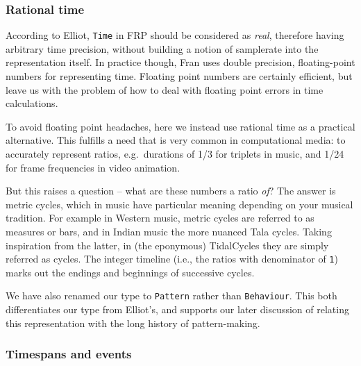\subsubsection{Rational time}\label{rational-time}

According to Elliot, \texttt{Time} in FRP should be considered as
\emph{real}, therefore having arbitrary time precision, without building
a notion of samplerate into the representation itself. In practice
though, Fran uses double precision, floating-point numbers for
representing time. Floating point numbers are certainly efficient, but
leave us with the problem of how to deal with floating point errors in
time calculations.

To avoid floating point headaches, here we instead use rational time as
a practical alternative. This fulfills a need that is very common in
computational media: to accurately represent ratios, e.g.~durations of
1/3 for triplets in music, and 1/24 for frame frequencies in video
animation.

\begin{Shaded}
\begin{Highlighting}[]
  \OtherTok{=} 
 \OtherTok{=}  \OtherTok{{-}\textgreater{}}\NormalTok{ [a]}
\end{Highlighting}
\end{Shaded}

But this raises a question -- what are these numbers a ratio \emph{of}?
The answer is metric cycles, which in music have particular meaning
depending on your musical tradition. For example in Western music,
metric cycles are referred to as measures or bars, and in Indian music
the more nuanced Tala cycles. Taking inspiration from the latter, in
(the eponymous) TidalCycles they are simply referred as cycles. The
integer timeline (i.e., the ratios with denominator of \texttt{1}) marks
out the endings and beginnings of successive cycles.

We have also renamed our type to \texttt{Pattern} rather than
\texttt{Behaviour}. This both differentiates our type from Elliot's, and
supports our later discussion of relating this representation with the
long history of pattern-making.

\subsubsection{Timespans and events}\label{timespans-and-events}

